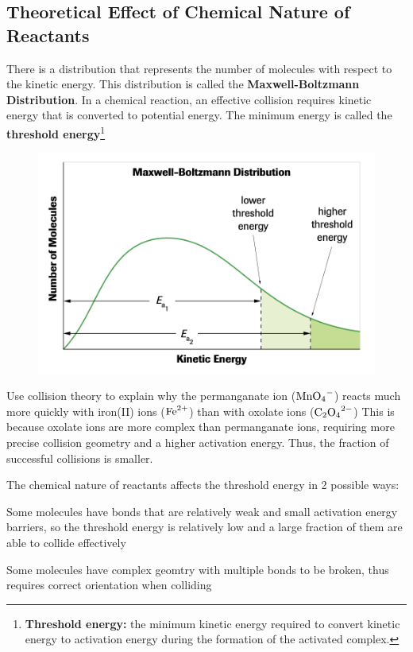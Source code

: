 \subsection{Theoretical Effect of Chemical Nature of Reactants}
There is a distribution that represents the number of molecules with respect to the kinetic energy.
This distribution is called the \textbf{Maxwell-Boltzmann Distribution}. In a chemical reaction,
an effective collision requires kinetic energy that is converted to potential energy. The minimum
energy is called the \textbf{threshold energy}\footnote{
    \textbf{Threshold energy:} the minimum kinetic energy required to convert kinetic energy to
    activation energy during the formation of the activated complex.
}

\begin{figure}[ht!]
    \centering
    \includegraphics[width=0.8 \textwidth]{../figures/maxwell-boltzmann-distribution.png}
\end{figure}

\begin{sample}{Use collision theory to explain why the permanganate ion ($\ch{MnO4^-}$) reacts much
    more quickly with iron(II) ions ($\ch{Fe}^{2+}$) than with oxolate ions ($\ch{C2O4^{2-}}$)}
    This is because oxolate ions are more complex than permanganate ions, requiring more precise
    collision geometry and a higher activation energy. Thus, the fraction of successful collisions
    is smaller.
\end{sample}

The chemical nature of reactants affects the threshold energy in 2 possible ways:
\begin{enum}
    \item Some molecules have bonds that are relatively weak and small activation energy barriers,
        so the threshold energy is relatively low and a large fraction of them are able to collide effectively
    \item Some molecules have complex geomtry with multiple bonds to be broken, thus requires correct
        orientation when colliding
\end{enum}

